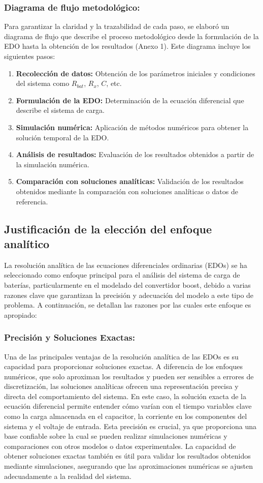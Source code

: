 \subsubsection*{Diagrama de flujo metodológico:}
Para garantizar la claridad y la trazabilidad de cada paso, se elaboró un diagrama de flujo que
describe el proceso metodológico desde la formulación de la EDO hasta la obtención de los
resultados (Anexo 1). Este diagrama incluye los siguientes pasos:
\begin{enumerate}
    \item \textbf{Recolección de datos:} Obtención de los parámetros iniciales y condiciones del sistema como \(R_{bat}\), \(R_x\), \(C\), etc.
    \item \textbf{Formulación de la EDO:} Determinación de la ecuación diferencial que describe el sistema de carga.
    \item \textbf{Simulación numérica:} Aplicación de métodos numéricos para obtener la solución temporal de la EDO.
    \item \textbf{Análisis de resultados:} Evaluación de los resultados obtenidos a partir de la simulación numérica.
    \item \textbf{Comparación con soluciones analíticas:} Validación de los resultados obtenidos mediante la comparación con soluciones analíticas o datos de referencia.
\end{enumerate}

\subsection{Justificación de la elección del enfoque analítico}
La resolución analítica de las ecuaciones diferenciales ordinarias (EDOs) se ha seleccionado como
enfoque principal para el análisis del sistema de carga de baterías, particularmente en el modelado del
convertidor boost, debido a varias razones clave que garantizan la precisión y adecuación del modelo
a este tipo de problema. A continuación, se detallan las razones por las cuales este enfoque es
apropiado:

\subsubsection*{Precisión y Soluciones Exactas:}
Una de las principales ventajas de la resolución analítica de las EDOs es su capacidad para
proporcionar soluciones exactas. A diferencia de los enfoques numéricos, que solo aproximan
los resultados y pueden ser sensibles a errores de discretización, las soluciones analíticas
ofrecen una representación precisa y directa del comportamiento del sistema. En este caso, la
solución exacta de la ecuación diferencial permite entender cómo varían con el tiempo
variables clave como la carga almacenada en el capacitor, la corriente en los componentes del
sistema y el voltaje de entrada. Esta precisión es crucial, ya que proporciona una base
confiable sobre la cual se pueden realizar simulaciones numéricas y comparaciones con otros
modelos o datos experimentales. La capacidad de obtener soluciones exactas también es útil
para validar los resultados obtenidos mediante simulaciones, asegurando que las
aproximaciones numéricas se ajusten adecuadamente a la realidad del sistema.

